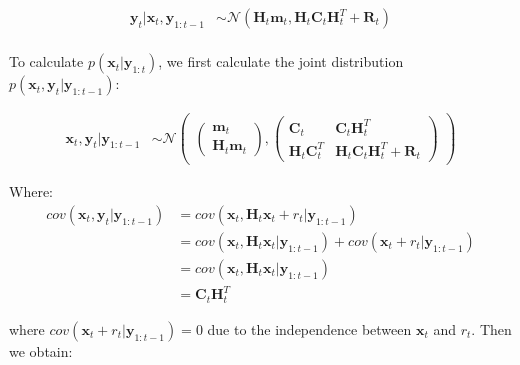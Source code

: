 \documentclass[
]{article}
\begin{document}
\[
\begin{equation}
    \begin{aligned}
        \textbf{y}_t|\textbf{x}_t, \textbf{y}_{1:t-1} &\sim \mathcal{N}(\textbf{H}_{t}\textbf{m}_t, \textbf{H}_t\textbf{C}_t\textbf{H}_t^T + \textbf{R}_{t}) \\
    \end{aligned}
\end{equation}
\]

To calculate \(p(\textbf{x}_t|\textbf{y}_{1:t})\), we first calculate
the joint distribution
\(p(\textbf{x}_t, \textbf{y}_t|\textbf{y}_{1:t-1})\):

\[
\begin{equation} 
    \begin{aligned} 
        \textbf{x}_t, \textbf{y}_t|\textbf{y}_{1:t-1} &\sim \mathcal{N}
        \begin{pmatrix}
            \begin{pmatrix}
                \textbf{m}_t \\
                \textbf{H}_{t}\textbf{m}_t
            \end{pmatrix}, 
            \begin{pmatrix}
                \textbf{C}_t & \textbf{C}_t\textbf{H}_{t}^T \\
                \textbf{H}_{t}\textbf{C}_t^T & \textbf{H}_t\textbf{C}_t\textbf{H}_t^T + \textbf{R}_{t}
            \end{pmatrix}
        \end{pmatrix}
    \end{aligned}
\end{equation}
\]

Where: \[
\begin{align*}
    cov(\textbf{x}_t, \textbf{y}_t|\textbf{y}_{1:t-1}) &= cov(\textbf{x}_t, \textbf{H}_t\textbf{x}_t + r_t|\textbf{y}_{1:t-1}) \\
                                                       &= cov(\textbf{x}_t, \textbf{H}_t\textbf{x}_t|\textbf{y}_{1:t-1}) + cov(\textbf{x}_t + r_t|\textbf{y}_{1:t-1}) \\
                                                       &= cov(\textbf{x}_t, \textbf{H}_t\textbf{x}_t|\textbf{y}_{1:t-1}) \\
                                                       &= \textbf{C}_t\textbf{H}_{t}^T
\end{align*}
\]

where \(cov(\textbf{x}_t + r_t|\textbf{y}_{1:t-1}) = 0\) due to the
independence between \(\textbf{x}_t\) and \(r_t\). Then we obtain:
\end{document}
